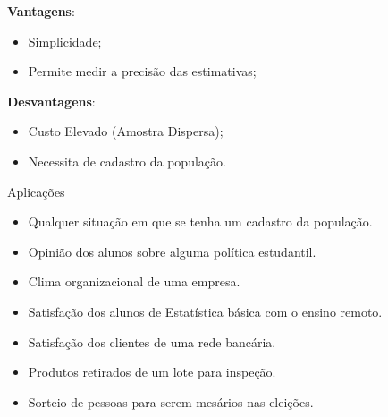 \documentclass[14pt,aspectratio=1610]{beamer}
\begin{document}
\begin{frame}{}
\begin{block}{}
\justifying
\begin{minipage}[t]{0.45\textwidth}
\textbf{Vantagens}: 
\smallskip
\begin{itemize}[label={}]
    \item Simplicidade;
    \item Permite medir a precisão das estimativas;
\end{itemize}
\end{minipage}%
\begin{minipage}[t]{0.5\textwidth}
\textbf{Desvantagens}:
\smallskip
\begin{itemize}[label={}]
    \item Custo Elevado (Amostra Dispersa);
    \item Necessita de cadastro da população.
\end{itemize}
\end{minipage}
\end{block}
\end{frame}

\begin{frame}{Aplicações}
    \begin{block}{}
    \justifying
\begin{itemize}[label={}]
\item Qualquer situação em que se tenha um cadastro da população.\pause
\item Opinião dos alunos sobre alguma política estudantil.\pause
\item Clima organizacional de uma empresa. \pause
\item Satisfação dos alunos de Estatística básica com o ensino remoto.\pause
\item Satisfação dos clientes de uma rede bancária.\pause
\item Produtos retirados de um lote para inspeção.\pause
\item Sorteio de pessoas para serem mesários nas eleições.
\end{itemize}
    \end{block}
\end{frame}
\end{document}
